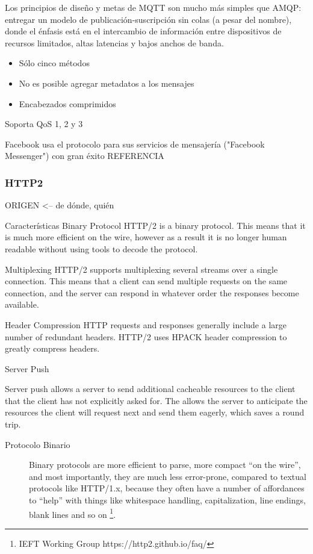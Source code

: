 Los principios de diseño y metas de MQTT son mucho más simples que AMQP: entregar un modelo de publicación-suscripción sin colas (a pesar del nombre), donde el énfasis está en el intercambio de información entre dispositivos de recursos limitados, altas latencias y bajos anchos de banda.

\begin{itemize}
  \item Sólo cinco métodos
  \item No es posible agregar metadatos a los mensajes
  \item Encabezados comprimidos
\end{itemize}

Soporta QoS 1, 2 y 3

Facebook usa el protocolo para sus servicios de mensajería ("Facebook Messenger") con gran éxito REFERENCIA

\subsubsection{HTTP2}

ORIGEN <-- de dónde, quién



Características
Binary Protocol
    HTTP/2 is a binary protocol. This means that it is much more efficient on the wire, however as a result it is no longer human readable without using tools to decode the protocol.

Multiplexing
    HTTP/2 supports multiplexing several streams over a single connection. This means that a client can send multiple requests on the same connection, and the server can respond in whatever order the responses become available.

Header Compression
    HTTP requests and responses generally include a large number of redundant headers. HTTP/2 uses HPACK header compression to greatly compress headers.

Server Push

    Server push allows a server to send additional cacheable resources to the client that the client has not explicitly asked for. The allows the server to anticipate the resources the client will request next and send them eagerly, which saves a round trip.



\begin{description}
  \item [Protocolo Binario]{Binary protocols are more efficient to parse, more compact “on the wire”, and most importantly, they are much less error-prone, compared to textual protocols like HTTP/1.x, because they often have a number of affordances to “help” with things like whitespace handling, capitalization, line endings, blank lines and so on \footnote{IEFT Working Group https://http2.github.io/faq/}.}
\end{description}

